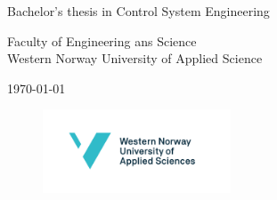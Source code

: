 \documentclass[../main.tex]{subfiles}
\begin{document}
    \begin{titlepage}
        \centering
        
        \maketitle
        
        \vfill
        
        \LARGE{Bachelor's thesis in Control System Engineering}

        \Large{Faculty of Engineering ans Science\\
        Western Norway University of Applied Science}
        
        \vfill
        
        \large{\today}
        
        \vfill
        
        \begin{figure}[h!]
            \includegraphics[height=70pt]{resources/images/hvl_logo_engelsk.pdf}
        \end{figure}
        
    \end{titlepage}
\end{document}
